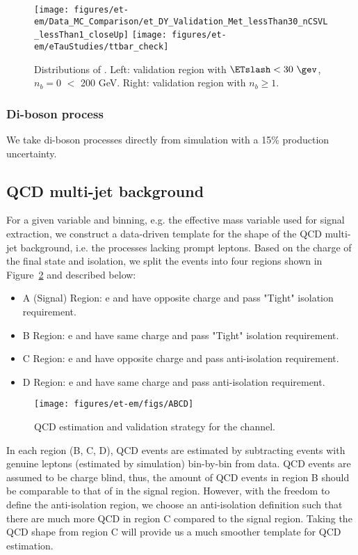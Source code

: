 \begin{figure}\centering
  \texttt{[image: figures/et-em/Data\_MC\_Comparison/et\_DY\_Validation\_Met\_lessThan30\_nCSVL\_lessThan1\_closeUp]}
  \texttt{[image: figures/et-em/eTauStudies/ttbar\_check]}
  \caption{\label{fig:et_dy_tt} Distributions of \meffetau. Left:
    validation region with $\ETslash<30~\gev$, $n_b = 0$ \meffetau $<$ 200 GeV.  Right:
    validation region with $n_b\geq1$.}
\end{figure}

\subsubsection{Di-boson process}
We take di-boson processes directly from simulation with a 15\% production uncertainty.

    
\subsection{QCD multi-jet background}\label{sec:etau_qcd}
For a given variable and binning, e.g. the effective mass variable
used for signal extraction, we construct a data-driven template for
the shape of the QCD multi-jet background, i.e. the processes lacking
prompt leptons.  Based on the charge of the final state and \tauh isolation,
we split the events into four regions shown in Figure~\ref{fig:ABCD} and 
described below:
\begin{itemize}
  \item A (Signal) Region: e and \tauh have opposite charge and \tauh pass "Tight" isolation requirement.
  \item B Region: e and \tauh have same charge and \tauh pass "Tight" isolation requirement.
  \item C Region: e and \tauh have opposite charge and \tauh pass anti-isolation requirement.
  \item D Region: e and \tauh have same charge and \tauh pass anti-isolation requirement.
\end{itemize}

\begin{figure}\centering
  \texttt{[image: figures/et-em/figs/ABCD]}
  \caption{\label{fig:ABCD} QCD estimation and validation strategy for the \teth channel.}
\end{figure}
In each region (B, C, D), QCD events are estimated by subtracting events
with genuine leptons (estimated by simulation) bin-by-bin from data.
QCD events are assumed to be charge blind, thus, the amount of QCD events in region B should be 
comparable to that of in the signal region. However, with the freedom to define the
anti-isolation region, we choose an anti-isolation definition such
that there are much more QCD in region C compared to the signal region. 
Taking the QCD shape from region C will provide us 
a much smoother template for QCD estimation.

